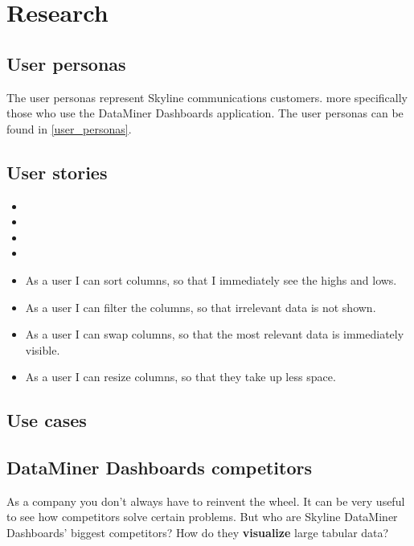 \chapter{Research}

    \section{User personas}
         The user personas represent Skyline communications customers. more specifically those who use the DataMiner Dashboards application. The user personas can be found in \autoref{user_personas}.
    \section{User stories}
        \begin{itemize}
            \item {}
            \item {}
            \item {}
            \item {}
        \end{itemize}
        \begin{itemize}
            dit moeten er 15 a 20 zijn.
            \item {As a user I can sort columns, so that I immediately see the highs and lows.}
            \item {As a user I can filter the columns, so that irrelevant data is not shown. }
            \item {As a user I can swap columns, so that the most relevant data is immediately visible.}
            \item {As a user I can resize columns, so that they take up less space.}
        \end{itemize}
    \section{Use cases}
        
    \section{DataMiner Dashboards competitors}
        As a company you don't always have to reinvent the wheel. It can be very useful to see how competitors solve certain problems. But who are Skyline DataMiner Dashboards' biggest competitors? How do they \textbf{visualize} large tabular data?
        

